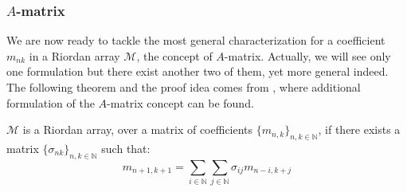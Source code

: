 \subsubsection{$A$-matrix}

We are now ready to tackle the most general characterization for a coefficient
$m_{nk}$ in a Riordan array $\mathcal{M}$, the concept of $A$-matrix. Actually,
we will see only one formulation but there exist another two of them, yet more
general indeed. The following theorem and the proof idea comes from 
\cite{merlini:some:alternative:characterizations:1997}, where additional
formulation of the $A$-matrix concept can be found.

\begin{theorem}
    $\mathcal{M}$ is a Riordan array, over a matrix of coefficients
    $\lbrace m_{n,k}\rbrace_{n,k\in\mathbb{N}}$, if there exists a matrix
    $\lbrace \sigma_{nk}\rbrace_{n,k\in\mathbb{N}}$ such that:
    \begin{displaymath}
        m_{n+1,k+1}=\sum_{i\in\mathbb{N}}{\sum_{j\in\mathbb{N}}{\sigma_{ij}m_{n-i,k+j}}}
    \end{displaymath}
\end{theorem}

